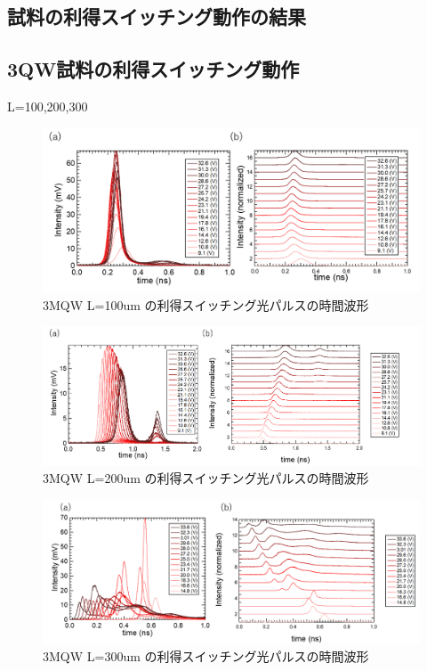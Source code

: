 \subsection{試料の利得スイッチング動作の結果}
\subsection{3QW試料の利得スイッチング動作}%
L=100,200,300
\begin{figure}[h]
	\centering
	\includegraphics[width=15cm]{figure/fig_3_2_3QW_ridge_L100_GS.png}
		\caption{3MQW L=100um の利得スイッチング光パルスの時間波形}
		\label{fig:fig_3_2_3QW_ridge_L100_GS}
\end{figure}

\begin{figure}[h]
	\centering
	\includegraphics[width=15cm]{figure/fig_3_2_3QW_ridge_L200_GS.png}
		\caption{3MQW L=200um の利得スイッチング光パルスの時間波形}
		\label{fig:fig_3_2_3QW_ridge_L200_GS}
\end{figure}
\begin{figure}[h]
	\centering
	\includegraphics[width=15cm]{figure/fig_3_2_3QW_ridge_L300_GS.png}
		\caption{3MQW L=300um の利得スイッチング光パルスの時間波形}
		\label{fig:fig_3_2_3QW_ridge_L300_GS}
\end{figure}
\newpage
　　
